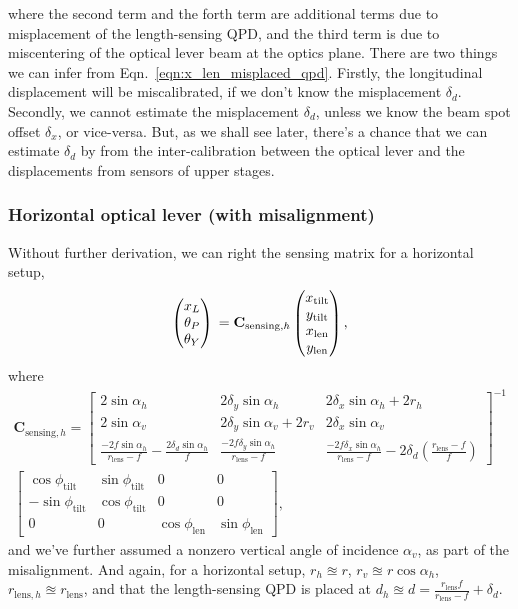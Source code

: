 where the second term and the forth term are additional terms due to misplacement of the length-sensing QPD, and the third term is due to miscentering of the optical lever beam at the optics plane.
There are two things we can infer from Eqn.~\ref{eqn:x_len_misplaced_qpd}.
Firstly, the longitudinal displacement will be miscalibrated, if we don't know the misplacement $\delta_d$.
Secondly, we cannot estimate the misplacement $\delta_d$, unless we know the beam spot offset $\delta_x$, or vice-versa.
But, as we shall see later, there's a chance that we can estimate $\delta_d$ by from the inter-calibration between the optical lever and the displacements from sensors of upper stages.

\subsubsection{Horizontal optical lever (with misalignment)}
Without further derivation, we can right the sensing matrix for a horizontal setup,
\begin{equation}
	\begin{pmatrix}
		x_L\\
		\theta_P\\
		\theta_Y
	\end{pmatrix}\\
	=
	\mathbf{C}_{\mathrm{sensing},h}
	\begin{pmatrix}
		x_\mathrm{tilt}\\
		y_\mathrm{tilt}\\
		x_\mathrm{len}\\
		y_\mathrm{len}
	\end{pmatrix},
\end{equation}
where
\begin{multline}
	\mathbf{C}_{\mathrm{sensing},h}=
	\begin{bmatrix}
		2\sin\alpha_h & 2\delta_y\sin\alpha_h & 2\delta_x\sin\alpha_h + 2r_h\\
		2\sin\alpha_v & 2\delta_y\sin\alpha_v + 2r_v & 2\delta_x\sin\alpha_v\\
		\frac{-2f\sin\alpha_h}{r_\mathrm{lens}-f} - \frac{2\delta_d\sin\alpha_h}{f} & \frac{-2f\delta_y\sin\alpha_h}{r_\mathrm{lens}-f} & \frac{-2f\delta_x\sin\alpha_h}{r_\mathrm{lens}-f} - 2\delta_d\left(\frac{r_\mathrm{lens}-f}{f}\right)
	\end{bmatrix}^{-1}\\
	\begin{bmatrix}
		\cos\phi_\mathrm{tilt} & \sin\phi_\mathrm{tilt} & 0 & 0\\
		-\sin\phi_\mathrm{tilt} & \cos\phi_\mathrm{tilt} & 0 & 0\\
		0 & 0 & \cos\phi_\mathrm{len} & \sin\phi_\mathrm{len}
	\end{bmatrix},
	\label{eqn:sensing_matrix_misaling_horizontal}
\end{multline}
and we've further assumed a nonzero vertical angle of incidence $\alpha_v$, as part of the misalignment.
And again, for a horizontal setup, $r_h\approxeq r$, $r_v\approxeq r\cos\alpha_h$, $r_{\mathrm{lens},h}\approxeq r_\mathrm{lens}$, and that the length-sensing QPD is placed at $d_h \approxeq d = \frac{r_\mathrm{lens}f}{r_\mathrm{lens}-f}+\delta_d$.

